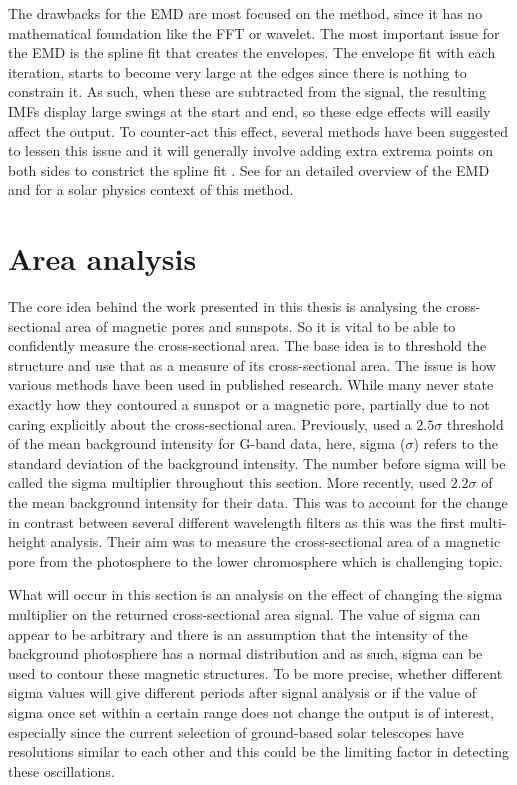     The drawbacks for the EMD are most focused on the method, since it has no mathematical foundation like the FFT or wavelet.
    The most important issue for the EMD is the spline fit that creates the envelopes.
    The envelope fit with each iteration, starts to become very large at the edges since there is nothing to constrain it.
    As such, when these are subtracted from the signal, the resulting IMFs display large swings at the start and end, so these edge effects will easily affect the output.
    To counter-act this effect, several methods have been suggested to lessen this issue and it will generally involve adding extra extrema points on both sides to constrict the spline fit \citep{zeng2004simple}.
    See \cite{huang} for an detailed overview of the EMD and  \cite{terradas} for a solar physics context of this method.
    
\section{Area analysis}

	The core idea behind the work presented in this thesis is analysing the cross-sectional area of magnetic pores and sunspots.
	So it is vital to be able to confidently measure the cross-sectional area.
    The base idea is to threshold the structure and use that as a measure of its cross-sectional area.
    The issue is how various methods have been used in published research.
    While many never state exactly how they contoured a sunspot or a magnetic pore, partially due to not caring explicitly about the cross-sectional area.
    Previously, \cite{morton2011} used a $2.5\sigma$ threshold of the mean background intensity for G-band data, here, sigma ($\sigma$) refers to the standard deviation of the background intensity.
    The number before sigma will be called the sigma multiplier throughout this section.
	More recently, \cite{0004-637X-806-1-132} used $2.2\sigma$ of the mean background intensity for their data.
    This was to account for the change in contrast between several different wavelength filters as this was the first multi-height analysis.
    Their aim was to measure the cross-sectional area of a magnetic pore from the photosphere to the lower chromosphere which is challenging topic.
	
	What will occur in this section is an analysis on the effect of changing the sigma multiplier on the returned cross-sectional area signal.
    The value of sigma can appear to be arbitrary and there is an assumption that the intensity of the background photosphere has a normal distribution and as such, sigma can be used to contour these magnetic structures.
    To be more precise, whether different sigma values will give different periods after signal analysis or if the value of sigma once set within a certain range does not change the output is of interest, especially since the current selection of ground-based solar telescopes have resolutions similar to each other and this could be the limiting factor in detecting these oscillations.
    
